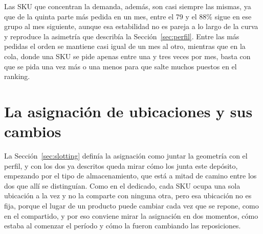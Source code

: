 Las SKU que concentran la demanda, además, son casi siempre las mismas, ya que de la quinta parte más pedida en un mes, entre el 79 y el 88\% sigue en ese grupo al mes siguiente, aunque esa estabilidad no es pareja a lo largo de la curva y reproduce la asimetría que describía la Sección~\ref{sec:perfil}.
Entre las más pedidas el orden se mantiene casi igual de un mes al otro, mientras que en la cola, donde una SKU se pide apenas entre una y tres veces por mes, basta con que se pida una vez más o una menos para que salte muchos puestos en el ranking.

\section{La asignación de ubicaciones y sus cambios}
\label{sec:asignacion-deposito}

La Sección~\ref{sec:slotting} definía la asignación como juntar la geometría con el perfil, y con los dos ya descritos queda mirar cómo los junta este depósito, empezando por el tipo de almacenamiento, que está a mitad de camino entre los dos que allí se distinguían.
Como en el dedicado, cada SKU ocupa una sola ubicación a la vez y no la comparte con ninguna otra, pero esa ubicación no es fija, porque el lugar de un producto puede cambiar cada vez que se repone, como en el compartido, y por eso conviene mirar la asignación en dos momentos, cómo estaba al comenzar el período y cómo la fueron cambiando las reposiciones.

